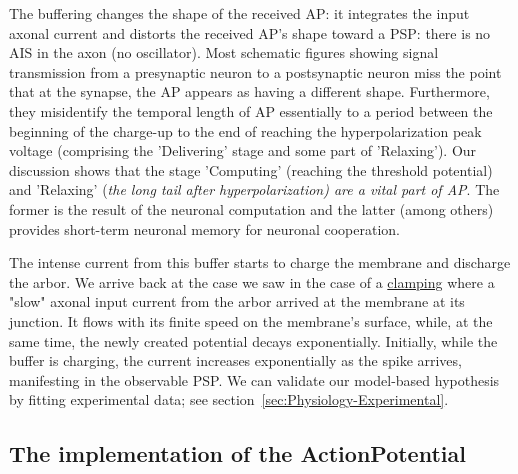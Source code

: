 The buffering changes the shape of the received 
AP: it integrates the input axonal current and distorts the received
AP's
 shape toward a 
 PSP: there is no 
 AIS in the axon (no oscillator).
Most schematic figures 
showing signal transmission from a presynaptic neuron to a postsynaptic neuron
miss the point that at the synapse, the
AP
 appears as having
a different shape. Furthermore, they misidentify the temporal length of
AP essentially to
a period between the beginning of the charge-up to the end of reaching
the hyperpolarization peak voltage (comprising the 'Delivering' stage and some part of 'Relaxing').
Our discussion shows that the stage 'Computing' (reaching the threshold potential) and 'Relaxing' (\textit{the long tail
after hyperpolarization) are a vital part of 
AP}. The former is the result of the neuronal computation and the latter (among others) provides
short-term neuronal memory for neuronal cooperation.



The intense current from this buffer starts to charge the membrane
and discharge the arbor. We arrive back at the case we saw in the
case of a \hyperlink{voltage-clamping}{clamping} where a "slow"
axonal input current from the arbor arrived at the membrane at its
junction. It flows with its finite speed on the membrane's surface,
while, at the same time, the newly created potential decays exponentially. 
Initially, while the buffer is charging, the current
increases exponentially as the spike arrives, manifesting 
in the observable 
PSP.
We can validate our model-based hypothesis by fitting experimental
data; see section~\ref{sec:Physiology-Experimental}.



\subsection[The implementation]{The implementation of the ActionPotential\label{Single-APImplementation}}

